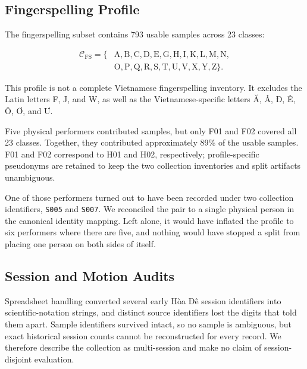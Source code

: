 \subsection{Fingerspelling Profile}
\label{subsec:fingerspelling_profile}

The fingerspelling subset contains 793 usable samples across 23 classes:

\begin{equation}
\begin{aligned}
\mathcal{C}_{\mathrm{FS}}=\{&
\mathrm{A},\mathrm{B},\mathrm{C},\mathrm{D},\mathrm{E},
\mathrm{G},\mathrm{H},\mathrm{I},\mathrm{K},\mathrm{L},
\mathrm{M},\mathrm{N},\\
&
\mathrm{O},\mathrm{P},\mathrm{Q},\mathrm{R},\mathrm{S},
\mathrm{T},\mathrm{U},\mathrm{V},\mathrm{X},\mathrm{Y},
\mathrm{Z}\}.
\end{aligned}
\label{eq:fingerspelling_classes}
\end{equation}

This profile is not a complete Vietnamese fingerspelling inventory. It
excludes the Latin letters F, J, and W, as well as the
Vietnamese-specific letters Ă, Â, Đ, Ê, Ô, Ơ, and Ư.

Five physical performers contributed samples, but only F01 and F02
covered all 23 classes. Together, they contributed approximately 89\%
of the usable samples. F01 and F02 correspond to H01 and H02,
respectively; profile-specific pseudonyms are retained to keep the two
collection inventories and split artifacts unambiguous.

One of those performers turned out to have been recorded under two
collection identifiers, \texttt{S005} and \texttt{S007}. We reconciled
the pair to a single physical person in the canonical identity mapping.
Left alone, it would have inflated the profile to six performers where
there are five, and nothing would have stopped a split from placing one
person on both sides of itself.

\subsection{Session and Motion Audits}
\label{subsec:session_motion_audits}

Spreadsheet handling converted several early Hòa Đê session identifiers
into scientific-notation strings, and distinct source identifiers lost
the digits that told them apart. Sample identifiers survived intact, so
no sample is ambiguous, but exact historical session counts cannot be
reconstructed for every record. We therefore describe the collection as
multi-session and make no claim of session-disjoint evaluation.

